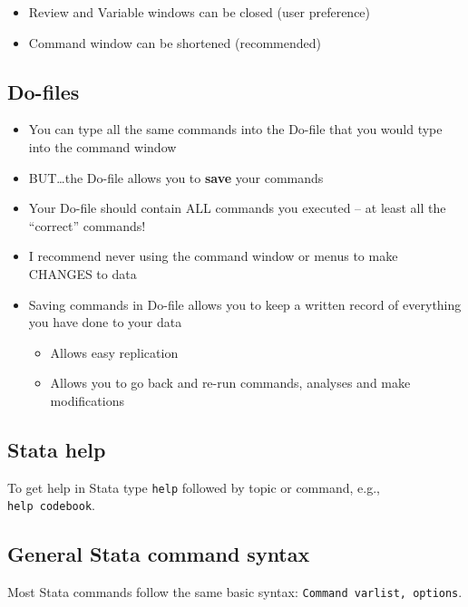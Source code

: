 \documentclass[]{book}
\providecommand{\tightlist}{%
  \setlength{\itemsep}{0pt}\setlength{\parskip}{0pt}}
\begin{document}
\begin{itemize}
\tightlist
\item
  Review and Variable windows can be closed (user preference)
\item
  Command window can be shortened (recommended)
\end{itemize}

\subsection{Do-files}\label{do-files}

\begin{itemize}
\tightlist
\item
  You can type all the same commands into the Do-file that you would
  type into the command window
\item
  BUT\ldots{}the Do-file allows you to \textbf{save} your commands
\item
  Your Do-file should contain ALL commands you executed -- at least all
  the ``correct'' commands!
\item
  I recommend never using the command window or menus to make CHANGES to
  data
\item
  Saving commands in Do-file allows you to keep a written record of
  everything you have done to your data

  \begin{itemize}
  \tightlist
  \item
    Allows easy replication
  \item
    Allows you to go back and re-run commands, analyses and make
    modifications
  \end{itemize}
\end{itemize}

\subsection{Stata help}\label{stata-help}

To get help in Stata type \texttt{help} followed by topic or command,
e.g., \texttt{help\ codebook}.

\subsection{General Stata command
syntax}\label{general-stata-command-syntax}

Most Stata commands follow the same basic syntax:
\texttt{Command\ varlist,\ options}.
\end{document}
